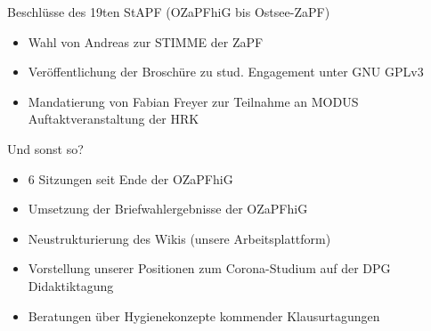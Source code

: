 \documentclass[compress, aspectratio=169]{beamer}
\begin{document}
\begin{frame}{Beschlüsse des 19ten StAPF (OZaPFhiG bis Ostsee-ZaPF)}
  \begin{itemize}
      \item Wahl von Andreas zur STIMME der ZaPF
      \item Veröffentlichung der Broschüre zu stud. Engagement unter GNU GPLv3
      \item Mandatierung von Fabian Freyer zur Teilnahme an MODUS Auftaktveranstaltung der HRK
  \end{itemize}
\end{frame}


\begin{frame}{Und sonst so?}
  \begin{itemize}
    \item 6 Sitzungen seit Ende der OZaPFhiG
    \item Umsetzung der Briefwahlergebnisse der OZaPFhiG
    \item Neustrukturierung des Wikis (unsere Arbeitsplattform)
    \item Vorstellung unserer Positionen zum Corona-Studium auf der DPG Didaktiktagung
    \item Beratungen über Hygienekonzepte kommender Klausurtagungen
  \end{itemize}
\end{frame}
\end{document}
